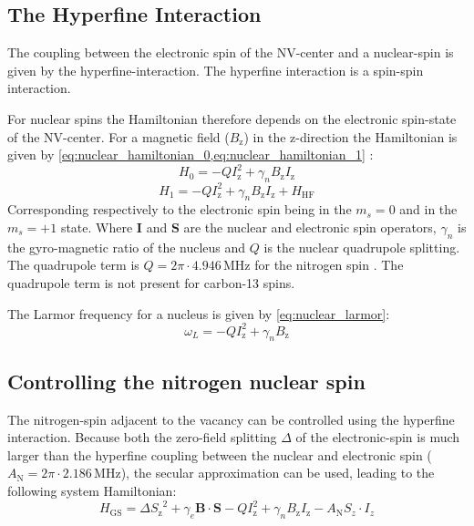 \subsection{The Hyperfine Interaction}
The coupling between the electronic spin of the NV-center and a nuclear-spin is given by the hyperfine-interaction.
The hyperfine interaction is a spin-spin interaction.

For nuclear spins the Hamiltonian therefore depends on the electronic spin-state of the NV-center.
For a magnetic field ($B_\mathrm{z}$) in the z-direction the Hamiltonian is given by \cref{eq:nuclear_hamiltonian_0,eq:nuclear_hamiltonian_1} \citep{Taminiau2014Universal}:
\begin{equation}
    \label{eq:nuclear_hamiltonian_0}
    H_0= -Q I_{\mathrm{z}}^2+ \gamma_{n} B_\mathrm{z} I_\mathrm{z}
\end{equation}
\begin{equation}
    \label{eq:nuclear_hamiltonian_1}
    H_1 = -Q I_{\mathrm{z}}^2+\gamma_{n} B_\mathrm{z} I_\mathrm{z} +H_{\mathrm{HF}}
\end{equation}
Corresponding respectively to the electronic spin being in the $m_s = 0$ and in the $m_s = +1$ state.
Where $\bm{I}$ and $\bm{S}$ are the nuclear and electronic spin operators, $\gamma_n$ is the gyro-magnetic ratio of the nucleus and $Q$ is the nuclear quadrupole splitting.
The quadrupole term is $Q= 2\pi \cdot 4.946 \,\mathrm{ MHz}$ for the nitrogen spin \citep{Bernien2014Control}.
The quadrupole term is not present for carbon-13 spins.


The Larmor frequency for a nucleus is given by  \cref{eq:nuclear_larmor}:
\begin{equation}
\label{eq:nuclear_larmor}
{\omega_L} =-Q{I}_{\mathrm{z}}^2+ \gamma_{n}B_\mathrm{z}
\end{equation}

\subsection{Controlling the nitrogen nuclear spin}
\label{sec:nitrogen_spin_control}
The nitrogen-spin adjacent to the vacancy can be controlled using the hyperfine interaction.
Because both the zero-field splitting $\Delta$ of the electronic-spin is much larger than the hyperfine coupling between the nuclear and electronic spin ($A_\mathrm{N} = 2\pi \cdot 2.186 \, \mathrm{MHz} $), the secular approximation can be used, leading to the following system Hamiltonian:
\begin{equation}
        H_\mathrm{GS} = \Delta {{S}_\mathrm{z}}^2 + \gamma_e \bm{B} \cdot \bm{S} -Q I_{\mathrm{z}}^2+\gamma_{n} B_\mathrm{z} I_\mathrm{z} - A_\mathrm{N} S_z\cdot {I_z}
\end{equation}

